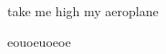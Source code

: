 \documentclass{article}
\providecommand{\*}{{\myralph}}
\providecommand{\*}{{\myralph}}
\begin{document}
{}

take me high my aeroplane

{}eouoeuoeoe
\end{document}
